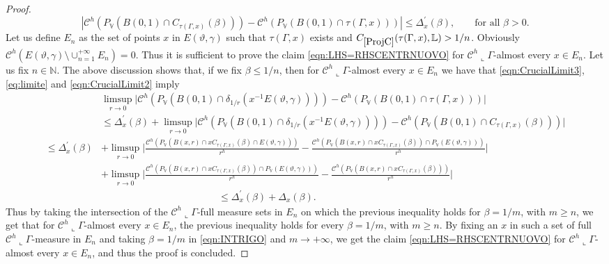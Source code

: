 \documentclass[10pt, a4paper,
oneside, headinclude,footinclude]{scrartcl}
\begin{document}
\begin{proof}
\begin{equation}
    |\mathcal{C}^h(P_{\mathbb V}(B(0,1)\cap C_{\tau(\Gamma,x)}(\beta)))-\mathcal{C}^h(P_{\mathbb V}(B(0,1)\cap\tau(\Gamma,x)))|\leq \Delta^\prime_x(\beta), \qquad \text{for all $\beta>0$}.
\end{equation}
Let us define $E_n$ as the set of points $x$ in $E(\vartheta,\gamma)$ such that $\tau(\Gamma,x)$ exists and $\oldC{ProjC}(\tau(\Gamma,x),\mathbb L)>1/n$. Obviously $\mathcal{C}^h(E(\vartheta,\gamma)\setminus \cup_{n=1}^{+\infty} E_n)=0$. Thus it is sufficient to prove the claim \eqref{eqn:LHS=RHSCENTRNUOVO} for $\mathcal{C}^h\llcorner\Gamma$-almost every $x\in E_n$. Let us fix $n\in\mathbb N$.
The above discussion shows that, if we fix $\beta\leq 1/n$, then for $\mathcal{C}^h\llcorner\Gamma$-almost every $x\in E_n$ we have that \eqref{eqn:CrucialLimit3}, \eqref{eq:limite} and \eqref{eqn:CrucialLimit2} imply
\begin{equation}\label{eqn:INTRIGO}
    \begin{split}
       &\limsup_{r\to 0}\lvert \mathcal{C}^h(P_{\mathbb V}(B(0,1)\cap\delta_{1/r}(x^{-1}E(\vartheta,\gamma))))-\mathcal{C}^h(P_{\mathbb V}(B(0,1)\cap\tau(\Gamma,x)))\rvert\\
        &\leq \Delta^\prime_x(\beta)+\limsup_{r\to 0}\lvert \mathcal{C}^h(P_{\mathbb V}(B(0,1)\cap\delta_{1/r}(x^{-1}E(\vartheta,\gamma))))-\mathcal{C}^h(P_{\mathbb V}(B(0,1)\cap C_{\tau(\Gamma,x)}(\beta)))\rvert\\
        \leq\Delta^\prime_x(\beta)&+\limsup_{r\to 0}\Big\lvert \frac{\mathcal{C}^h(P_{\mathbb V}(B(x,r)\cap xC_{\tau(\Gamma,x)}(\beta)\cap  E(\vartheta,\gamma)))}{r^h}-\frac{\mathcal{C}^h(P_{\mathbb V}(B(x,r)\cap xC_{\tau(\Gamma,x)}(\beta))\cap P_{\mathbb V}(E(\vartheta,\gamma)))}{r^h}\Big\rvert\\
        &+\limsup_{r\to0}\Big\lvert \frac{\mathcal{C}^h(P_{\mathbb V}(B(x,r)\cap xC_{\tau(\Gamma,x)}(\beta))\cap P_{\mathbb V}(E(\vartheta,\gamma)))}{r^h}-\frac{\mathcal{C}^h(P_{\mathbb V}(B(x,r)\cap xC_{\tau(\Gamma,x)}(\beta)))}{r^h}\Big\rvert\\
        &\qquad\qquad\qquad\qquad\qquad\qquad\leq \Delta^\prime_x(\beta)+\Delta_x(\beta).
    \end{split}
\end{equation}
Thus by taking the intersection of the $\mathcal{C}^h\llcorner\Gamma$-full measure sets in $E_n$ on which the previous inequality holds for $\beta=1/m$, with $m\geq n$, we get that for $\mathcal{C}^h\llcorner\Gamma$-almost every $x\in E_n$, the previous inequality holds for every $\beta=1/m$, with $m\geq n$. By fixing an $x$ in such a set of full $\mathcal{C}^h\llcorner\Gamma$-measure in $E_n$ and taking $\beta=1/m$ in \eqref{eqn:INTRIGO} and $m\to +\infty$, we get the claim \eqref{eqn:LHS=RHSCENTRNUOVO} for $\mathcal{C}^h\llcorner\Gamma$-almost every $x\in E_n$, and thus the proof is concluded.




\end{proof}
\end{document}
